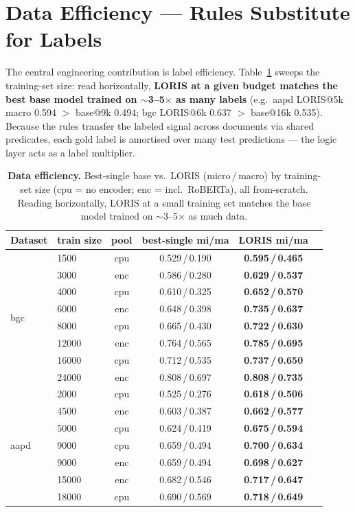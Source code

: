 \documentclass[11pt]{article}
\newcommand{\bld}[1]{\textbf{#1}}\newcommand{\gn}[1]{\textcolor{blue}{#1}}
\begin{document}
\section{Data Efficiency --- Rules Substitute for Labels}
\label{sec:dataeff}
The central engineering contribution is label efficiency. Table~\ref{tab:dataeff} sweeps the training-set
size: read horizontally, \textbf{LORIS at a given budget matches the best base model trained on
$\sim$3--5$\times$ as many labels} (e.g.\ aapd LORIS@5k macro 0.594 $>$ base@9k 0.494; bgc LORIS@6k 0.637
$>$ base@16k 0.535). Because the rules transfer the labeled signal across documents via shared predicates,
each gold label is amortised over many test predictions --- the logic layer acts as a label multiplier.
\begin{table}[h]\centering
\caption{\textbf{Data efficiency.} Best-single base vs.\ LORIS (micro\,/\,macro) by training-set size
(cpu = no encoder; enc = incl.\ RoBERTa), all from-scratch. Reading horizontally, LORIS at a small
training set matches the base model trained on $\sim$3--5$\times$ as much data.}
\label{tab:dataeff}\small
\begin{tabular}{llcccc}
\toprule
Dataset & train size & pool & best-single mi/ma & \bld{LORIS} mi/ma \\
\midrule
\multirow{8}{*}{bgc}
 & 1500 & cpu & 0.529\,/\,0.190 & \bld{0.595\,/\,0.465} \\
 & 3000 & enc & 0.586\,/\,0.280 & \bld{0.629\,/\,0.537} \\
 & 4000 & cpu & 0.610\,/\,0.325 & \bld{0.652\,/\,0.570} \\
 & 6000 & enc & 0.648\,/\,0.398 & \bld{0.735\,/\,0.637} \\
 & 8000 & cpu & 0.665\,/\,0.430 & \bld{0.722\,/\,0.630} \\
 & 12000 & enc & 0.764\,/\,0.565 & \bld{0.785\,/\,0.695} \\
 & 16000 & cpu & 0.712\,/\,0.535 & \bld{0.737\,/\,0.650} \\
 & 24000 & enc & 0.808\,/\,0.697 & \bld{0.808\,/\,0.735} \\
\midrule
\multirow{7}{*}{aapd}
 & 2000 & cpu & 0.525\,/\,0.276 & \bld{0.618\,/\,0.506} \\
 & 4500 & enc & 0.603\,/\,0.387 & \bld{0.662\,/\,0.577} \\
 & 5000 & cpu & 0.624\,/\,0.419 & \bld{0.675\,/\,0.594} \\
 & 9000 & cpu & 0.659\,/\,0.494 & \bld{0.700\,/\,0.634} \\
 & 9000 & enc & 0.659\,/\,0.494 & \bld{0.698\,/\,0.627} \\
 & 15000 & enc & 0.682\,/\,0.546 & \bld{0.717\,/\,0.647} \\
 & 18000 & cpu & 0.690\,/\,0.569 & \bld{0.718\,/\,0.649} \\
\bottomrule
\end{tabular}
\end{table}
\end{document}
